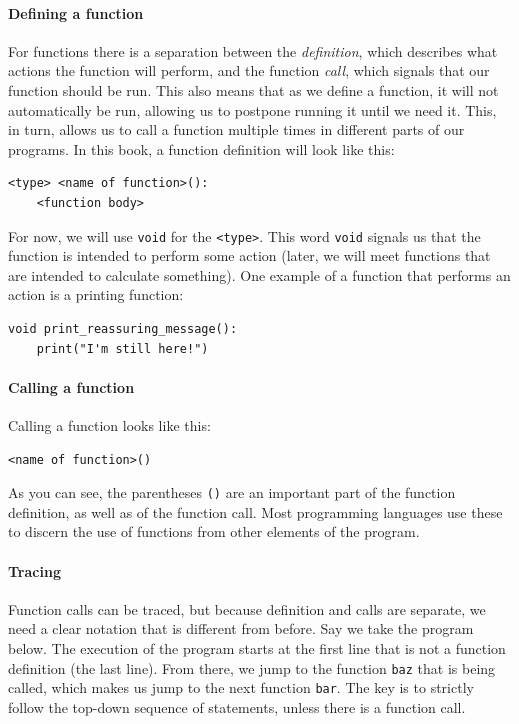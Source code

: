 \paragraph{Defining a function}

For functions there is a separation between the \emph{definition}, which describes what actions the function will perform, and the function \emph{call}, which signals that our function should be run. This also means that as we define a function, it will not automatically be run, allowing us to postpone running it until we need it. This, in turn, allows us to call a function multiple times in different parts of our programs. In this book, a function definition will look like this:

\begin{verbatim}
<type> <name of function>():
    <function body>
\end{verbatim}

For now, we will use \texttt{void} for the \texttt{<type>}. This word \texttt{void} signals us that the function is intended to perform some action (later, we will meet functions that are intended to calculate something). One example of a function that performs an action is a printing function:

\begin{verbatim}
void print_reassuring_message():
    print("I'm still here!")
\end{verbatim}

\paragraph{Calling a function}

Calling a function looks like this:

\begin{verbatim}
<name of function>()
\end{verbatim}

As you can see, the parentheses \texttt{()} are an important part of the function definition, as well as of the function call. Most programming languages use these to discern the use of functions from other elements of the program.


\paragraph{Tracing} Function calls can be traced, but because definition and calls are separate, we need a clear notation that is different from before. Say we take the program below. The execution of the program starts at the first line that is not a function definition (the last line). From there, we jump to the function \texttt{baz} that is being called, which makes us jump to the next function \texttt{bar}. The key is to strictly follow the top-down sequence of statements, unless there is a function call.


